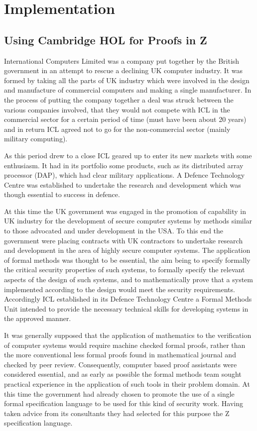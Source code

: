 \documentclass[10pt,titlepage]{book}
\begin{document}
\section{Implementation}


\subsection{Using Cambridge HOL for Proofs in Z}

International Computers Limited was a company put together by the British government in an attempt to rescue a declining UK computer industry.
It was formed by taking all the parts of UK industry which were involved in the design and manufacture of commercial computers and making a single manufacturer.
In the process of putting the company together a deal was struck between the various companies involved, that they would not compete with ICL in the commercial sector for a certain period of time (must have been about 20 years) and in return ICL agreed not to go for the non-commercial sector (mainly military computing).

As this period drew to a close ICL geared up to enter its new markets with some enthusiasm.
It had in its portfolio some products, such as its distributed array processor (DAP), which had clear military applications.
A Defence Technology Centre was established to undertake the research and development which was though essential to success in defence.

At this time the UK government was engaged in the promotion of capability in UK industry for the development of secure computer systems by methods similar to those advocated and under development in the USA.
To this end the government were placing contracts with UK contractors to undertake research and development in the area of highly secure computer systems.
The application of formal methods was thought to be essential, the aim being to specify formally the critical security properties of such systems, to formally specify the relevant aspects of the design of such systems, and to mathematically prove that a system implemented according to the design would meet the security requirements.
Accordingly ICL established in its Defence Technology Centre a Formal Methods Unit intended to provide the necessary technical skills for developing systems in the approved manner.

It was generally supposed that the application of mathematics to the verification of computer systems would require machine checked formal proofs, rather than the more conventional less formal proofs found in mathematical journal and checked by peer review.
Consequently, computer based proof assistants were considered essential, and as early as possible the formal methods team sought practical experience in the application of such tools in their problem domain.
At this time the government had already chosen to promote the use of a single formal specification language to be used for this kind of security work.
Having taken advice from its consultants they had selected for this purpose the Z specification language.
\end{document}
